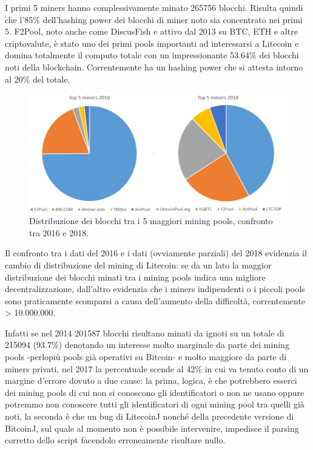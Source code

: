 I primi 5 miners hanno complessivamente minato 265756 blocchi. Risulta quindi che l’85\% dell’hashing power dei blocchi di miner noto sia concentrato nei primi 5. 
F2Pool, noto anche come DiscusFish e attivo dal 2013 su BTC, ETH e altre criptovalute, è stato uno dei primi pools importanti ad interessarsi a Litecoin e domina totalmente il computo totale con un impressionante 53.64\% dei blocchi noti della blockchain. Correntemente ha un hashing power che si attesta intorno al 20\% del totale.

\begin{figure}[h!]
	\centering
	\includegraphics[width=1.0\linewidth]{images/top5miners2016vs2018}
	\caption{Distribuzione dei blocchi tra i 5 maggiori mining pools, confronto tra 2016 e 2018.}
	\label{fig:top5miners2016vs2018}
\end{figure}



Il confronto tra i dati del 2016 e i dati (ovviamente parziali) del 2018 evidenzia il cambio di distribuzione del mining di Litecoin: se da un lato la maggior distribuzione dei blocchi minati tra i mining pools indica una migliore decentralizzazione, dall’altro evidenzia che i miners indipendenti o i piccoli pools sono praticamente scomparsi a causa dell’aumento della difficoltà, correntemente > 10.000.000.

Infatti se nel 2014 201587 blocchi risultano minati da ignoti su un totale di 215094 (93.7\%) denotando un interesse molto marginale da parte dei mining pools -perlopiù pools già operativi su Bitcoin- e molto maggiore da parte di miners privati, nel 2017 la percentuale scende al 42\% in cui va tenuto conto di un margine d’errore dovuto a due cause: la prima, logica, è che potrebbero esserci dei mining pools di cui non si conoscono gli identificatori o non ne usano oppure potremmo non conoscere tutti gli identificatori di ogni mining pool tra quelli già noti, la seconda è che un bug di LitecoinJ nonché della precedente versione di BitcoinJ, sul quale al momento non è possibile intervenire, impedisce il parsing corretto dello script facendolo erroneamente risultare nullo.

